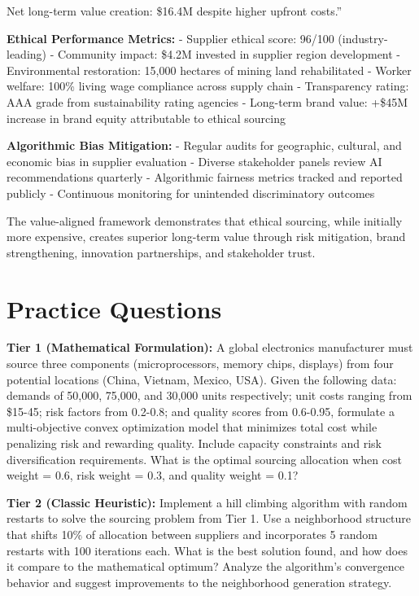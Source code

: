 \documentclass{article}
\begin{document}
Net long-term value creation: \$16.4M despite higher upfront costs.''

\textbf{Ethical Performance Metrics:}
- Supplier ethical score: 96/100 (industry-leading)
- Community impact: \$4.2M invested in supplier region development
- Environmental restoration: 15,000 hectares of mining land rehabilitated
- Worker welfare: 100\% living wage compliance across supply chain
- Transparency rating: AAA grade from sustainability rating agencies
- Long-term brand value: +\$45M increase in brand equity attributable to ethical sourcing

\textbf{Algorithmic Bias Mitigation:}
- Regular audits for geographic, cultural, and economic bias in supplier evaluation
- Diverse stakeholder panels review AI recommendations quarterly
- Algorithmic fairness metrics tracked and reported publicly
- Continuous monitoring for unintended discriminatory outcomes

The value-aligned framework demonstrates that ethical sourcing, while initially more expensive, creates superior long-term value through risk mitigation, brand strengthening, innovation partnerships, and stakeholder trust.

\section{Practice Questions}

\textbf{Tier 1 (Mathematical Formulation):} 
A global electronics manufacturer must source three components (microprocessors, memory chips, displays) from four potential locations (China, Vietnam, Mexico, USA). Given the following data: demands of 50,000, 75,000, and 30,000 units respectively; unit costs ranging from \$15-45; risk factors from 0.2-0.8; and quality scores from 0.6-0.95, formulate a multi-objective convex optimization model that minimizes total cost while penalizing risk and rewarding quality. Include capacity constraints and risk diversification requirements. What is the optimal sourcing allocation when cost weight = 0.6, risk weight = 0.3, and quality weight = 0.1?

\textbf{Tier 2 (Classic Heuristic):}
Implement a hill climbing algorithm with random restarts to solve the sourcing problem from Tier 1. Use a neighborhood structure that shifts 10\% of allocation between suppliers and incorporates 5 random restarts with 100 iterations each. What is the best solution found, and how does it compare to the mathematical optimum? Analyze the algorithm's convergence behavior and suggest improvements to the neighborhood generation strategy.
\end{document}
